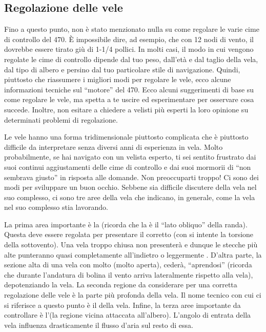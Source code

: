 \subsection{Regolazione delle vele}
\label{subsec:RegolazioneDelleVele}
Fino a questo punto, non è stato menzionato nulla su come regolare le varie cime
di controllo del 470. È impossibile dire, ad esempio, che con 12 nodi di vento,
il \cunningham dovrebbe essere tirato giù di 1-1/4 pollici. In molti casi, il
modo in cui vengono regolate le cime di controllo dipende dal tuo peso, dall'età
e dal taglio della vela, dal tipo di albero e persino dal tuo particolare stile
di navigazione. Quindi, piuttosto che riassumere i migliori modi per regolare le
vele, ecco alcune informazioni tecniche sul ``motore'' del 470. Ecco alcuni
suggerimenti di base su come regolare le vele, ma spetta a te uscire ed
esperimentare per osservare cosa succede. Inoltre, non esitare a chiedere a
velisti più esperti la loro opinione su determinati problemi di regolazione.

Le vele hanno una forma tridimensionale piuttosto complicata che è piuttosto
difficile da interpretare senza diversi anni di esperienza in vela. Molto
probabilmente, se hai navigato con un velista esperto, ti sei sentito frustrato
dai suoi continui aggiustamenti delle cime di controllo e dai suoi mormorii di
``non sembrava giusto'' in risposta alle domande. Non preoccuparti troppo! Ci
sono dei modi per sviluppare un buon occhio. Sebbene sia difficile discutere
della vela nel suo complesso, ci sono tre aree della vela che indicano, in
generale, come la vela nel suo complesso stia lavorando.

La prima area importante è la \upperleech (ricorda che la \leech è il ``lato
obliquo'' della randa). Questa deve essere regolata per presentare il corretto
\twist (con \twist si intente la torsione della \leech sottovento). Una vela
troppo chiusa non presenterà \twist e dunque le stecche più alte punteranno
quasi completamente all'indietro o leggermente \windward. D'altra parte, la
sezione alta di una vela con molto \twist (molto aperta), cederà, ``aprendosi''
\leeward (ricorda che durante l'andatura di bolina il vento arriva lateralmente
rispetto alla vela), depotenziando la vela.
%
La seconda regione da considerare per una corretta regolazione delle vele è la
parte più profonda della vela. Il nome tecnico con cui ci si riferisce a questo
punto è il \emph{\draft} della vela.
%
Infine, la terza aree importante da controllare è l'\luff (la regione vicina
attaccata all'albero). L'angolo di entrata della vela influenza drasticamente il
flusso d'aria sul resto di essa.

